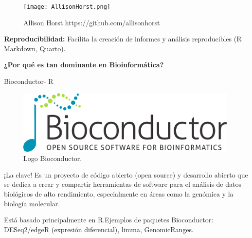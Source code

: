 \documentclass[11pt]{beamer}
\begin{document}
	
	\begin{frame}
		\begin{figure} %
	    		\centering %
  	  		\texttt{[image: AllisonHorst.png]} 
   	 		\caption{Allison Horst https://github.com/allisonhorst} 
    			\label{fig:Allison Horst} %
		\end{figure}
			\textbf {Reproducibilidad:} 
Facilita la creación de informes y análisis reproducibles (R Markdown, Quarto).
	\end{frame}
	

	\begin{frame}
		\centering
		\LARGE \textbf {¿Por qué es tan dominante en Bioinformática?}
	\end{frame}
	

	\begin{frame}{Bioconductor- R} 
		\begin{figure} %
    		\centering %
    		\includegraphics[width=0.8\linewidth]{bioconductor.png} %
    		\caption{Logo Bioconductor.} %
    		\label{fig:Bioconductor} %
	\end{figure}
 ¡La clave! Es un proyecto de código abierto (open source) y desarrollo abierto que se dedica a crear y compartir herramientas de software para el análisis de datos biológicos de alto rendimiento, especialmente en áreas como la genómica y la biología molecular.

Está basado principalmente en R.Ejemplos de paquetes Bioconductor: DESeq2/edgeR (expresión diferencial), limma, GenomicRanges.
	\end{frame}
	
\end{document}
